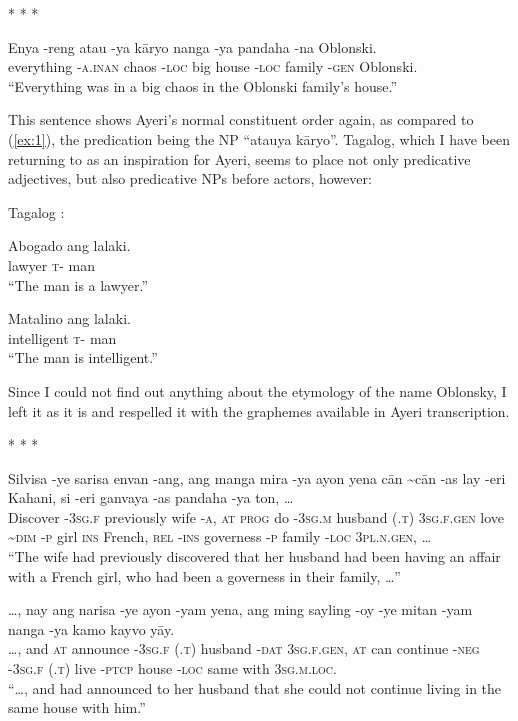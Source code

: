 \documentclass[12pt,paper=letter]{scrartcl}
\newcommand{\q}[1]{\enquote{#1}} %
\newcommand{\divider}{\vspace{0.5\baselineskip} \centerline{* * *} \vspace{0.5\baselineskip}}
\newcommand{\mor}[1]{\textsc{\lowercase{#1}}}
\begin{document}
\divider

\begin{exe}
    \ex
    \gll Enya -reng atau -ya kāryo nanga -ya pandaha -na Oblonski. \\
    everything \mor{-A.INAN} chaos \mor{-LOC} big house \mor{-LOC} family 
	\mor{-GEN} Oblonski. \\
    \glt \q{Everything was in a big chaos in the Oblonski family's house.}
\end{exe}

This sentence shows Ayeri's normal constituent order again, as compared to 
(\ref{ex:1}), the predication being the NP \q{atauya kāryo}. Tagalog,
which I have been returning to as an inspiration for Ayeri, seems to place 
not only predicative adjectives, but also predicative NPs before actors, however:

\begin{exe}
     Tagalog \autocite[499]{schachter}:
    \begin{xlist}
	\ex
	\gll Abogado ang lalaki. \\
	lawyer \mor{T-} man \\
	\glt \q{The man is a lawyer.}
	
	\ex
	\gll Matalino ang lalaki. \\
	intelligent \mor{T-} man \\
	\glt \q{The man is intelligent.}
    \end{xlist}
\end{exe}

Since I could not find out anything about the etymology of the name Oblonsky,
I left it as it is and respelled it with the graphemes available in Ayeri 
transcription.

\divider

\begin{exe}
    \ex
    \begin{xlist}
	\ex \gll Silvisa -ye sarisa envan -ang, ang manga mira -ya ayon {} yena 
	    cān \textasciitilde{}cān -as lay -eri Kahani, si -eri ganvaya -as 
	    pandaha -ya ton, … \\
	Discover \mor{-3SG.F} previously wife \mor{-A}, \mor{AT} \mor{PROG} do
	    \mor{-3SG.M} husband \mor{(.T)} \mor{3SG.F.GEN} love 
	    \mor{\textasciitilde{}DIM} \mor{-P} girl \mor{INS} French, 
	    \mor{REL} \mor{-INS} governess \mor{-P} family \mor{-LOC} 
	    \mor{3PL.N.GEN}, … \\
	\glt \q{The wife had previously discovered that her husband
	    had been having an affair with a French girl, who had been a
	    governess in their family, …}
	
	\ex \gll …, nay ang narisa -ye {} ayon -yam yena, ang ming sayling -oy 
	    -ye {} mitan -yam nanga -ya kamo kayvo yāy. \\
	…, and \mor{AT} announce \mor{-3SG.F} \mor{(.T)} husband \mor{-DAT}
	    \mor{3SG.F.GEN}, \mor{AT} can continue \mor{-NEG} \mor{-3SG.F} 
	    \mor{(.T)} live \mor{-PTCP} house \mor{-LOC} same with 
	    \mor{3SG.M.LOC}. \\
	\glt \q{…, and had announced to her husband that she could not 
	    continue living in the same house with him.}
    \end{xlist}
\end{exe}
\end{document}
